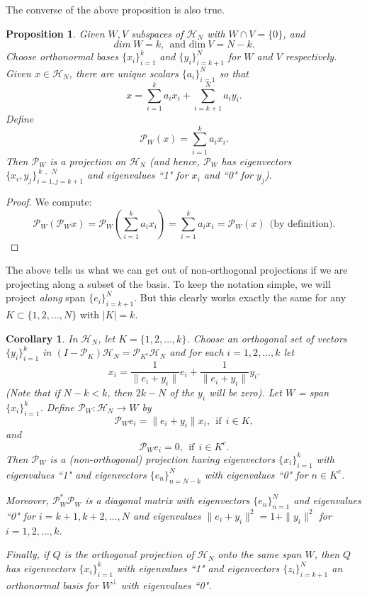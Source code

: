 \documentclass[11pt,reqno]{amsart}
\newtheorem{corollary}[thm]{Corollary}
\newtheorem{proposition}[thm]{Proposition}
\theoremstyle{remark}
\begin{document}
The converse of the above proposition is also true.

\begin{proposition}\label{prop2}
Given $W,V$ subspaces of ${\mathcal H}_N$ with $W\cap V = \{0\}$, and
\[ dim \ W=k,\ \ \mbox{and dim}\ V = N-k.\]
Choose orthonormal bases $\{x_i\}_{i=1}^k$ and $\{y_i\}_{i=k+1}^N$
for $W$ and $V$ respectively.  Given $x\in {\mathcal H}_N$, there are unique scalars
$\{a_i\}_{i=1}^N$ so that
\[ x = \sum_{i=1}^k a_ix_i + \sum_{i=k+1}^N a_iy_i.\]
Define
\[ {\mathcal P}_W(x) = \sum_{i=1}^k a_ix_i.\]
Then ${\mathcal P}_W$ is a projection on ${\mathcal H}_N$ (and hence, ${\mathcal P}_W$ has eigenvectors
$\{x_i,y_j\}_{i=1,j=k+1}^{ \ k\ \ ,\ \ N}$ and eigenvalues ``1" for $x_i$ and
``0" for $y_j$).
\end{proposition}

\begin{proof}
We compute:
\[ {\mathcal P}_W({\mathcal P}_Wx) = {\mathcal P}_W(\sum_{i=1}^k a_i x_i) = \sum_{i=1}^k a_ix_i= {\mathcal P}_W(x)\ \ \mbox{(by
definition)}.\]
\end{proof}

The above tells us what we can get out of non-orthogonal
projections if we are projecting along a subset of the basis.  To keep the notation
simple, we will project {\em along} span $\{e_i\}_{i=k+1}^N$.  But this clearly
works exactly the same for any $K\subset \{1,2,\ldots,N\}$ with $|K|=k$.

\begin{corollary}\label{cor1}
In ${\mathcal H}_N$, let $K=\{1,2,\ldots, k\}$.  Choose an orthogonal set of vectors
$\{y_i\}_{i=1}^k$ in $(I-{\mathcal P}_K){\mathcal H}_N = {\mathcal P}_{K^c}{\mathcal H}_N$ and for each
$i=1,2, \ldots ,k$ let
 \[ x_i =\frac{1}{\|e_i+y_i\|} e_i+\frac{1}{\|e_i+y_i\|}y_i.\]
   (Note that if $N-k < k$,
then $2k-N$ of the $y_i$ will be zero).  Let $W$ = span $\{x_i\}_{i=1}^k$.
Define ${\mathcal P}_W:{\mathcal H}_N \rightarrow W$ by
\[ {\mathcal P}_We_i = \|e_i+y_i\|x_i, \ \ \mbox{if}\ \ i\in K,\]
and
\[ {\mathcal P}_We_i =0,\ \ \mbox{if}\ \ i\in K^c.\]
Then ${\mathcal P}_W$ is a (non-orthogonal) projection having eigenvectors $\{x_i\}_{i=1}^k$
with eigenvalues  ``1" and eigenvectors $\{e_n\}_{n=N-k}^N$  with eigenvalues ``0" for $n\in K^c$.

Moreover, ${\mathcal P}_W^{*}{\mathcal P}_W$ is a diagonal matrix with eigenvectors $\{e_n\}_{n=1}^N$
and eigenvalues ``0" for $i=k+1,k+2,\ldots, N$ and eigenvalues
$\|e_i+y_i\|^2=1+\|y_i\|^2$ for $i=1,2,\ldots, k$.

Finally, if $Q$ is the orthogonal projection of ${\mathcal H}_N$ onto the same span $W$, then
$Q$ has eigenvectors $\{x_i\}_{i=1}^k$ with eigenvalues ``1" and eigenvectors
$\{z_i\}_{i=k+1}^N$ an orthonormal basis for $W^{\perp}$ with eigenvalues ``0".
\end{corollary}
\end{document}
